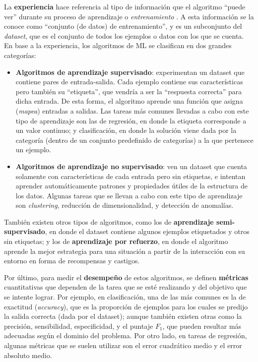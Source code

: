 \documentclass[../../main.tex]{subfiles}
\begin{document}
La \textbf{experiencia} hace referencia al tipo de información que el algoritmo ``puede
ver'' durante su proceso de aprendizaje o \textit{entrenamiento}
\cite{hands-on-ML-sklearn-tf}. A esta información se la conoce como ``conjunto (de datos)
de entrenamiento'', y es un subconjunto del \textit{dataset}, que es el conjunto de todos
los ejemplos o datos con los que se cuenta. En base a la experiencia, los algoritmos de ML
se clasifican en dos grandes categorías:
\begin{itemize}
    \item \textbf{Algoritmos de aprendizaje supervisado}: experimentan un dataset que
    contiene pares de entrada-salida. Cada ejemplo contiene sus características pero
    también su ``etiqueta'', que vendría a ser la ``respuesta correcta'' para dicha
    entrada. De esta forma, el algoritmo aprende una función que asigna (\textit{mapea})
    entradas a salidas. Las tareas más comunes llevadas a cabo con este tipo de
    aprendizaje son las de regresión, en donde la etiqueta corresponde a un valor
    continuo; y clasificación, en donde la solución viene dada por la categoría (dentro de
    un conjunto predefinido de categorías) a la que pertenece un ejemplo.
    \item \textbf{Algoritmos de aprendizaje no supervisado}: ven un dataset que cuenta
    solamente con características de cada entrada pero sin etiquetas, e intentan aprender
    automáticamente patrones y propiedades útiles de la estructura de los datos. Algunas
    tareas que se llevan a cabo con este tipo de aprendizaje son \textit{clustering},
    reducción de dimensionalidad, y detección de anomalías.
\end{itemize}
También existen otros tipos de algoritmos, como los de \textbf{aprendizaje
semi-supervisado}, en donde el dataset contiene algunos ejemplos etiquetados y otros sin
etiquetas; y los de \textbf{aprendizaje por refuerzo}, en donde el algoritmo aprende la
mejor estrategia para una situación a partir de la interacción con su entorno en forma de
recompensas y castigos.

Por último, para medir el \textbf{desempeño} de estos algoritmos, se definen
\textbf{métricas} cuantitativas que dependen de la tarea que se esté realizando y del
objetivo que se intente lograr. Por ejemplo, en clasificación, una de las más comunes es
la de exactitud (\textit{accuracy}), que es la proporción de ejemplos para los cuales se
predijo la salida correcta (dada por el dataset); aunque también existen otras como la
precisión, sensibilidad, especificidad, y el puntaje \(F_1\), que pueden resultar más
adecuadas según el dominio del problema. Por otro lado, en tareas de regresión, algunas
métricas que se suelen utilizar son el error cuadrático medio y el error absoluto medio.
\end{document}
